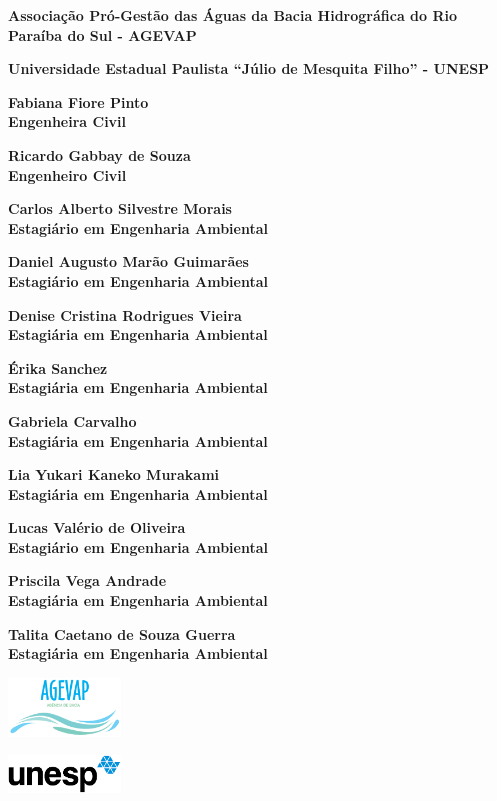 
	\begin{flushleft}
	\textbf{Associação Pró-Gestão das Águas da Bacia Hidrográfica do Rio Paraíba do Sul - AGEVAP}\vspace{1em}
	
	\textbf{Universidade Estadual Paulista “Júlio de Mesquita Filho” - UNESP}\vspace{1em}
	
	\textbf{Fabiana Fiore Pinto\\
	Engenheira Civil}\vspace{1em}
	
	\textbf{Ricardo Gabbay de Souza\\
	Engenheiro Civil}\vspace{1em}
	
	\textbf{Carlos Alberto Silvestre Morais\\
	Estagiário em Engenharia Ambiental}\vspace{1em}
	
	\textbf{Daniel Augusto Marão Guimarães\\
	Estagiário em Engenharia Ambiental}\vspace{1em}
	
	\textbf{Denise Cristina Rodrigues Vieira\\
	Estagiária em Engenharia Ambiental}\vspace{1em}
	
	\textbf{Érika Sanchez\\
	Estagiária em Engenharia Ambiental}\vspace{1em}
	
	\textbf{Gabriela Carvalho\\
	Estagiária em Engenharia Ambiental}\vspace{1em}
	
	\textbf{Lia Yukari Kaneko Murakami\\
	Estagiária em Engenharia Ambiental}\vspace{1em}
	
	\textbf{Lucas Valério de Oliveira\\
	Estagiário em Engenharia Ambiental}\vspace{1em}
	
	\textbf{Priscila Vega Andrade\\
	Estagiária em Engenharia Ambiental}\vspace{1em}
	
	\textbf{Talita Caetano de Souza Guerra\\
	Estagiária em Engenharia Ambiental}\vspace{5cm}
	\end{flushleft}
	
	\includegraphics[width=3cm]{src/basic/agevap}
	
	\hspace{0.3cm}\includegraphics[width=3cm]{src/basic/unesp}

\clearpage
\onecolumn